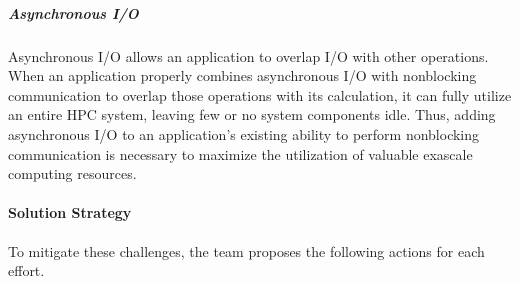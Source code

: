 
\subparagraph{Asynchronous I/O} Asynchronous I/O allows an application to overlap I/O with other operations. When an application properly combines asynchronous I/O with nonblocking communication to overlap those operations with its calculation, it can fully utilize an entire HPC system, leaving few or no system components idle. Thus, adding asynchronous I/O to an application's existing ability to perform nonblocking communication is necessary to maximize the utilization of valuable exascale computing resources.


\paragraph{Solution Strategy}
To mitigate these challenges, the team proposes the following actions for each effort.



